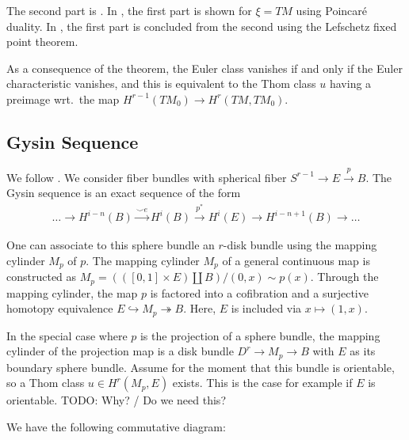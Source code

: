 \documentclass{scrartcl}
\theoremstyle{plain}
\theoremstyle{definition}
\newcommand{\cupp}{\mathbin{\smile}}
\newcommand{\iso}{\cong}
\newcommand{\injto}{\hookrightarrow}
\newcommand{\surjto}{\twoheadrightarrow}
\DeclareMathOperator{\id}{id}
\renewcommand{\coprod}{\mathbin{\amalg}}
\begin{document}
The second part is \cite[Thm 5.2]{hutchings2011cup}.
In \cite{milnor1974characteristic}, the first part is shown for $\xi=TM$ using Poincaré duality. In \cite{hutchings2011cup}, the first part is concluded from the second using the Lefschetz fixed point theorem.

As a consequence of the theorem, the Euler class vanishes if and only if the Euler characteristic vanishes, and this is equivalent to the Thom class $u$ having a preimage wrt.\ the map $H^{r-1}(TM_0) \to H^r(TM, TM_0)$.

\subsection{Gysin Sequence}\label{subsec:gysin_sequence}
We follow \cite[pp. 438]{hatcher2002algebraic}. We consider fiber bundles with spherical fiber $S^{r-1}\to E\xrightarrow{p} B$. The Gysin sequence is an exact sequence of the form 
\begin{align*}
    \dots \to H^{i-n}(B) \xrightarrow{\cupp e} H^i(B) \xrightarrow{p^*} H^i(E) \to H^{i-n+1}(B)\to \dots
\end{align*}

One can associate to this sphere bundle an $r$-disk bundle using the mapping  cylinder $M_p$ of $p$. The mapping cylinder $M_p$ of a general continuous map is constructed as $M_p = (([0, 1]\times E) \coprod B) / (0, x) \sim p(x)$. Through the mapping cylinder, the map $p$ is factored into a cofibration and a surjective homotopy equivalence $E \injto M_p \surjto B$. Here, $E$ is included via $x\mapsto (1, x)$. 

In the special case where $p$ is the projection of a sphere bundle, the mapping cylinder of the projection map is a disk bundle $D^r\to M_p \to B$ with $E$ as its boundary sphere bundle. Assume for the moment that this bundle is orientable, so a Thom class $u\in H^r(M_p, E)$ exists. This is the case for example if $E$ is orientable. TODO: Why? / Do we need this?

We have the following commutative diagram: 

\end{document}

